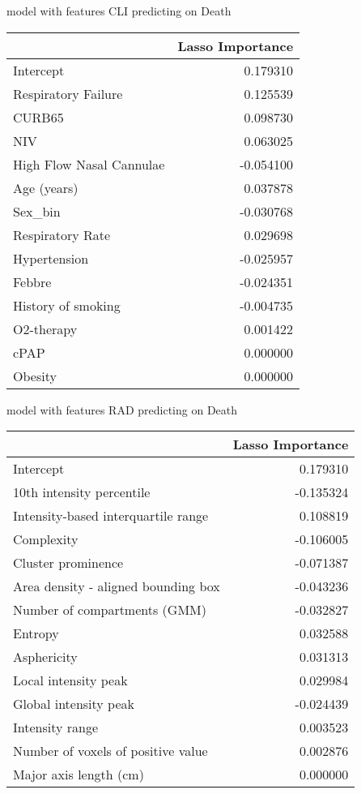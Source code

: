 model with features CLI predicting on Death\newline
\begin{tabular}{lr}
\toprule
{} &  Lasso Importance \\
\midrule
Intercept                &          0.179310 \\
Respiratory Failure      &          0.125539 \\
CURB65                   &          0.098730 \\
NIV                      &          0.063025 \\
High Flow Nasal Cannulae &         -0.054100 \\
Age (years)              &          0.037878 \\
Sex\_bin                  &         -0.030768 \\
Respiratory Rate         &          0.029698 \\
Hypertension             &         -0.025957 \\
Febbre                   &         -0.024351 \\
History of smoking       &         -0.004735 \\
O2-therapy               &          0.001422 \\
cPAP                     &          0.000000 \\
Obesity                  &          0.000000 \\
\bottomrule
\end{tabular}

model with features RAD predicting on Death\newline
\begin{tabular}{lr}
\toprule
{} &  Lasso Importance \\
\midrule
Intercept                           &          0.179310 \\
10th intensity percentile           &         -0.135324 \\
Intensity-based interquartile range &          0.108819 \\
Complexity                          &         -0.106005 \\
Cluster prominence                  &         -0.071387 \\
Area density - aligned bounding box &         -0.043236 \\
Number of compartments (GMM)        &         -0.032827 \\
Entropy                             &          0.032588 \\
Asphericity                         &          0.031313 \\
Local intensity peak                &          0.029984 \\
Global intensity peak               &         -0.024439 \\
Intensity range                     &          0.003523 \\
Number of voxels of positive value  &          0.002876 \\
Major axis length (cm)              &          0.000000 \\
\bottomrule
\end{tabular}

